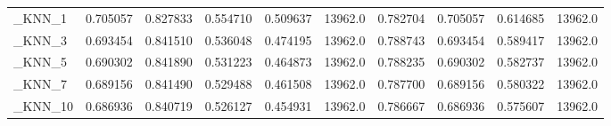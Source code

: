 \begin{tabular}{lrrrrrrrrr}
\_KNN\_1                                             &  0.705057 &         0.827833 &      0.554710 &        0.509637 &        13962.0 &            0.782704 &         0.705057 &           0.614685 &           13962.0 \\
\_KNN\_3                                             &  0.693454 &         0.841510 &      0.536048 &        0.474195 &        13962.0 &            0.788743 &         0.693454 &           0.589417 &           13962.0 \\
\_KNN\_5                                             &  0.690302 &         0.841890 &      0.531223 &        0.464873 &        13962.0 &            0.788235 &         0.690302 &           0.582737 &           13962.0 \\
\_KNN\_7                                             &  0.689156 &         0.841490 &      0.529488 &        0.461508 &        13962.0 &            0.787700 &         0.689156 &           0.580322 &           13962.0 \\
\_KNN\_10                                            &  0.686936 &         0.840719 &      0.526127 &        0.454931 &        13962.0 &            0.786667 &         0.686936 &           0.575607 &           13962.0 \\
\bottomrule
\end{tabular}
